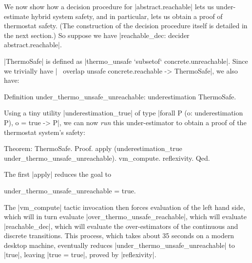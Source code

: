 \documentclass[runningheads]{llncs}
\newcommand{\weg}[1]{}
\begin{document}
We now show how a decision procedure for |abstract.reachable| lets us
under-estimate hybrid system safety, and in particular, lets us obtain
a proof of thermostat safety. (The construction of the decision
procedure itself is detailed in the next section.) So suppose we have
|reachable_dec: decider abstract.reachable|.
\weg{ And suppose we are
  given the following specification of unsafe concrete states, covered
  by a finite list of abstract states:
\begin{code}
  Variables
    (unsafe: concrete.State -> Prop)
    (astates: list abstract.State)
    (astates_cover_unsafe: forall s, unsafe s -> forall r, s `elem` r -> r `elem` astates).
\end{code}

Then, using |reachable_dec| and |unreachable_respect|, we can easily define
\begin{code}
  Definition over_unsafe_reachable: overestimation (overlap unsafe concrete.reachable).
\end{code}
Taking |unsafe := thermo_unsafe| and a suitable abstract cover, we obtain
\begin{code}
  Definition over_thermo_unsafe_reachable:
    overestimation (overlap thermo_unsafe concrete.reachable).
\end{code}
}
|ThermoSafe| is defined as |thermo_unsafe `subsetof` concrete.unreachable|.
Since we trivially have |~ overlap unsafe concrete.reachable -> ThermoSafe|, we also have:
\begin{code}
Definition under_thermo_unsafe_unreachable: underestimation ThermoSafe.
\end{code}
Using a tiny utility |underestimation_true| of type |forall P (o: underestimation P), o = true -> P|, we can now \emph{run} this under-estimator to obtain a proof of the thermostat system's safety:
\begin{code}
Theorem: ThermoSafe.
Proof.
  apply (underestimation_true under_thermo_unsafe_unreachable).
  vm_compute.  reflexivity.
Qed.
\end{code}
The first |apply| reduces the goal to
\begin{code}under_thermo_unsafe_unreachable = true.\end{code} The |vm_compute| tactic invocation then forces evaluation of the left hand side, which will in turn evaluate |over_thermo_unsafe_reachable|, which will evaluate |reachable_dec|, which will evaluate the over-estimators of the continuous and discrete transitions. This process, which takes about 35 seconds on a modern desktop machine, eventually reduces |under_thermo_unsafe_unreachable| to |true|, leaving |true = true|, proved by |reflexivity|.
\end{document}
